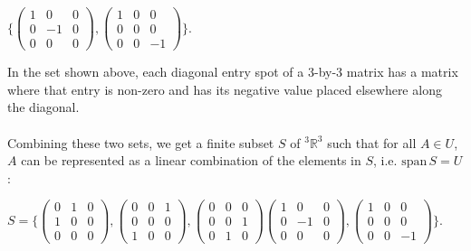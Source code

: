 \documentclass[10pt]{exam}
\begin{document}
\begin{center}
$\bigg\{ \begin{pmatrix}
	1 & 0 & 0 \\
	0 & -1 & 0 \\
	0 & 0 & 0 
\end{pmatrix},
\begin{pmatrix}
	1 & 0 & 0 \\
	0 & 0 & 0 \\
	0 & 0 & -1 
\end{pmatrix}\bigg\}$.
\end{center}
In the set shown above, each diagonal entry spot of a 3-by-3 matrix has a matrix where 
that entry is non-zero and has its negative value placed elsewhere along the diagonal.
\\\\
Combining these two sets, we get a finite subset $S$ of $^3\mathbb{R}^3$ such that 
for all $A \in U$, $A$ can be represented as a linear combination of the elements 
in $S$, i.e. $\mathrm{span}\, S =U$:

\begin{center}
$S = \bigg\{ \begin{pmatrix}
	0 & 1 & 0 \\
	1 & 0 & 0 \\
	0 & 0 & 0 
\end{pmatrix},
\begin{pmatrix}
	0 & 0 & 1 \\
	0 & 0 & 0 \\
	1 & 0 & 0 
\end{pmatrix},
\begin{pmatrix}
	0 & 0 & 0 \\
	0 & 0 & 1 \\
	0 & 1 & 0 
\end{pmatrix}
\begin{pmatrix}
	1 & 0 & 0 \\
	0 & -1 & 0 \\
	0 & 0 & 0 
\end{pmatrix},
\begin{pmatrix}
	1 & 0 & 0 \\
	0 & 0 & 0 \\
	0 & 0 & -1 
\end{pmatrix}\bigg\}$.
\end{center}




\end{document}
